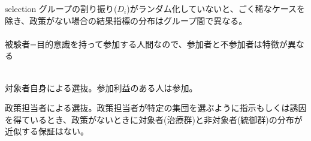 \begin{frame}{selection}
グループの割り振り($D_{i}$)がランダム化していないと、ごく稀なケースを除き、政策がない場合の結果指標の分布はグループ間で異なる。\\~\\

\pause
被験者=目的意識を持って参加する人間なので、参加者と不参加者は特徴が異なる\\~\\

\pause
\begin{description}[<+->]
\vspace{1.0ex}\setlength{\itemsep}{1.0ex}\setlength{\baselineskip}{12pt}
\item[自己選抜self-selection]	 対象者自身による選抜。参加利益のある人は参加。
\item[実施対象選抜placement selection]	政策担当者による選抜。政策担当者が特定の集団を選ぶように指示もしくは誘因を得ているとき、政策がないときに対象者(治療群)と非対象者(統御群)の分布が近似する保証はない。
\end{description}
\end{frame}





